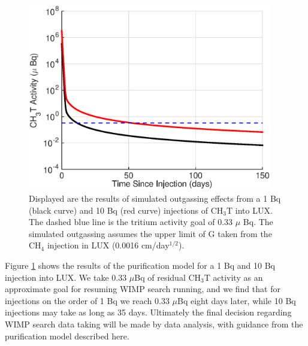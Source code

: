\begin{figure}[h!]
\centering
\includegraphics[width=0.95\textwidth]{fig/LUX_og_lim.eps}
\caption{Displayed are the results of simulated outgassing effects from a 1 Bq (black curve) and 10 Bq (red curve) injections of CH$_3$T into LUX. The dashed blue line is the tritium activity goal of 0.33 $\mu$ Bq. The simulated outgassing assumes the upper limit of G taken from the CH$_4$ injection in LUX (0.0016 cm/day$^{1/2}$).}
\label{fig:tau_var}
\end{figure}

Figure \ref{fig:tau_var} shows the results of the purification model for a 1 Bq and 10 Bq injection into LUX. We take 0.33 $\mu$Bq of residual CH$_3$T activity as an approximate goal for resuming WIMP search running, and we find that for injections on the order of 1 Bq we reach 0.33 $\mu$Bq eight days later, while 10 Bq injections may take as long as 35 days.  Ultimately the final decision regarding WIMP search data taking will be made by data analysis, with guidance from the purification model described here.